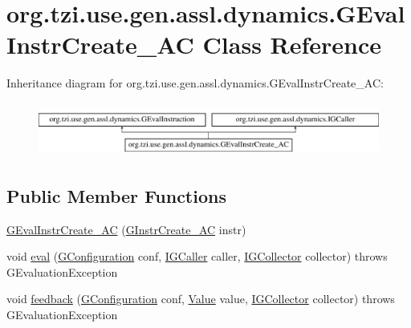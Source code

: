 \hypertarget{classorg_1_1tzi_1_1use_1_1gen_1_1assl_1_1dynamics_1_1_g_eval_instr_create___a_c}{\section{org.\-tzi.\-use.\-gen.\-assl.\-dynamics.\-G\-Eval\-Instr\-Create\-\_\-\-A\-C Class Reference}
\label{classorg_1_1tzi_1_1use_1_1gen_1_1assl_1_1dynamics_1_1_g_eval_instr_create___a_c}
}
Inheritance diagram for org.\-tzi.\-use.\-gen.\-assl.\-dynamics.\-G\-Eval\-Instr\-Create\-\_\-\-A\-C\-:\begin{figure}[H]
\begin{center}
\leavevmode
\includegraphics[height=1.794872cm]{classorg_1_1tzi_1_1use_1_1gen_1_1assl_1_1dynamics_1_1_g_eval_instr_create___a_c}
\end{center}
\end{figure}
\subsection*{Public Member Functions}
\begin{DoxyCompactItemize}
\item 
\hyperlink{classorg_1_1tzi_1_1use_1_1gen_1_1assl_1_1dynamics_1_1_g_eval_instr_create___a_c_a2a5ec5863d59d7e952cb9063df14b634}{G\-Eval\-Instr\-Create\-\_\-\-A\-C} (\hyperlink{classorg_1_1tzi_1_1use_1_1gen_1_1assl_1_1statics_1_1_g_instr_create___a_c}{G\-Instr\-Create\-\_\-\-A\-C} instr)
\item 
void \hyperlink{classorg_1_1tzi_1_1use_1_1gen_1_1assl_1_1dynamics_1_1_g_eval_instr_create___a_c_a7037e81e027089eb36c5cbac01a8cefb}{eval} (\hyperlink{classorg_1_1tzi_1_1use_1_1gen_1_1assl_1_1dynamics_1_1_g_configuration}{G\-Configuration} conf, \hyperlink{interfaceorg_1_1tzi_1_1use_1_1gen_1_1assl_1_1dynamics_1_1_i_g_caller}{I\-G\-Caller} caller, \hyperlink{interfaceorg_1_1tzi_1_1use_1_1gen_1_1assl_1_1dynamics_1_1_i_g_collector}{I\-G\-Collector} collector)  throws G\-Evaluation\-Exception 
\item 
void \hyperlink{classorg_1_1tzi_1_1use_1_1gen_1_1assl_1_1dynamics_1_1_g_eval_instr_create___a_c_a350cf1a83f6d3b6eed73e82e3e720cb7}{feedback} (\hyperlink{classorg_1_1tzi_1_1use_1_1gen_1_1assl_1_1dynamics_1_1_g_configuration}{G\-Configuration} conf, \hyperlink{classorg_1_1tzi_1_1use_1_1uml_1_1ocl_1_1value_1_1_value}{Value} value, \hyperlink{interfaceorg_1_1tzi_1_1use_1_1gen_1_1assl_1_1dynamics_1_1_i_g_collector}{I\-G\-Collector} collector)  throws G\-Evaluation\-Exception 
\end{DoxyCompactItemize}
